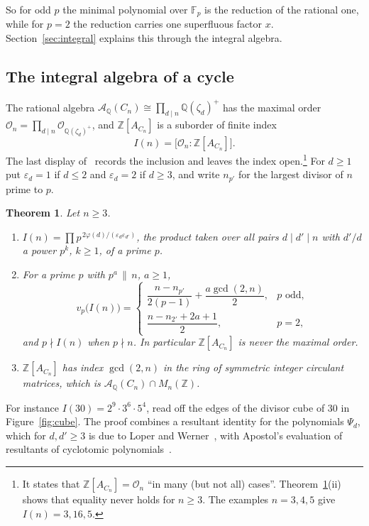 \documentclass[11pt]{amsart}
\newtheorem{thmx}{Theorem}
\theoremstyle{definition}
\theoremstyle{remark}
\numberwithin{equation}{section}
\newcommand{\Q}{\mathbb{Q}}
\newcommand{\Z}{\mathbb{Z}}
\newcommand{\F}{\mathbb{F}}
\newcommand{\cA}{\mathcal{A}}
\newcommand{\cO}{\mathcal{O}}
\begin{document}
So for odd $p$ the minimal polynomial over $\F_p$ is the reduction of the rational one, while for $p=2$ the reduction carries one superfluous factor $x$. Section~\ref{sec:integral} explains this through the integral algebra.

\subsection*{The integral algebra of a cycle} The rational algebra $\cA_\Q(C_n)\cong\prod_{d\mid n}\Q(\zeta_d)^+$ has the maximal order $\cO_n=\prod_{d\mid n}\cO_{\Q(\zeta_d)^+}$, and $\Z[A_{C_n}]$ is a suborder of finite index
\[
I(n)=\bigl[\cO_n:\Z[A_{C_n}]\bigr].
\]
The last display of~\cite{BMB} records the inclusion and leaves the index open.\footnote{It states that $\Z[A_{C_n}]=\cO_n$ ``in many (but not all) cases''. Theorem~\ref{thm:C}(ii) shows that equality never holds for $n\ge3$. The examples $n=3,4,5$ give $I(n)=3,16,5$.} For $d\ge1$ put $\varepsilon_d=1$ if $d\le2$ and $\varepsilon_d=2$ if $d\ge3$, and write $n_{p'}$ for the largest divisor of $n$ prime to $p$.

\begin{thmx}\label{thm:C}
Let $n\ge3$.
\begin{enumerate}
\item[(i)] $I(n)=\prod p^{\,2\varphi(d)/(\varepsilon_d\varepsilon_{d'})}$, the product taken over all pairs $d\mid d'\mid n$ with $d'/d$ a power $p^k$, $k\ge1$, of a prime $p$.
\item[(ii)] For a prime $p$ with $p^a\,\|\,n$, $a\ge1$,
\[
v_p\bigl(I(n)\bigr)=\begin{cases}\dfrac{n-n_{p'}}{2(p-1)}+\dfrac{a\gcd(2,n)}{2}, & p \text{ odd},\\[2ex] \dfrac{n-n_{2'}+2a+1}{2}, & p=2,\end{cases}
\]
and $p\nmid I(n)$ when $p\nmid n$. In particular $\Z[A_{C_n}]$ is never the maximal order.
\item[(iii)] $\Z[A_{C_n}]$ has index $\gcd(2,n)$ in the ring of symmetric integer circulant matrices, which is $\cA_\Q(C_n)\cap M_n(\Z)$.
\end{enumerate}
\end{thmx}

For instance $I(30)=2^9\cdot3^6\cdot5^4$, read off the edges of the divisor cube of $30$ in Figure~\ref{fig:cube}. The proof combines a resultant identity for the polynomials $\Psi_d$, which for $d,d'\ge3$ is due to Loper and Werner~\cite{LW}, with Apostol's evaluation of resultants of cyclotomic polynomials~\cite{Ap}.
\end{document}
